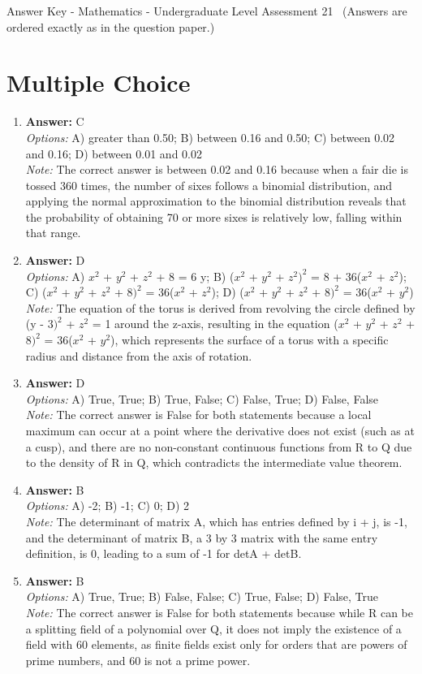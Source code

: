 \documentclass[12pt]{article}
\begin{document}
\begin{center}
Answer Key - Mathematics - Undergraduate Level Assessment 21 \
\small (Answers are ordered exactly as in the question paper.)
\end{center}

\section*{Multiple Choice}
\begin{enumerate}[label=\arabic*.]
\item \textbf{Answer:} C
\\ \textit{Options:} A) greater than 0.50; B) between 0.16 and 0.50; C) between 0.02 and 0.16; D) between 0.01 and 0.02
\\ \textit{Note:} The correct answer is between 0.02 and 0.16 because when a fair die is tossed 360 times, the number of sixes follows a binomial distribution, and applying the normal approximation to the binomial distribution reveals that the probability of obtaining 70 or more sixes is relatively low, falling within that range.
\item \textbf{Answer:} D
\\ \textit{Options:} A) $x^2$ + $y^2$ + $z^2$ + 8 = 6 y; B) ($x^2$ + $y^2$ + $z^2$$)^2$ = 8 + 36($x^2$ + $z^2$); C) ($x^2$ + $y^2$ + $z^2$ + $8)^2$ = 36($x^2$ + $z^2$); D) ($x^2$ + $y^2$ + $z^2$ + $8)^2$ = 36($x^2$ + $y^2$)
\\ \textit{Note:} The equation of the torus is derived from revolving the circle defined by (y - $3)^2$ + $z^2$ = 1 around the z-axis, resulting in the equation ($x^2$ + $y^2$ + $z^2$ + $8)^2$ = 36($x^2$ + $y^2$), which represents the surface of a torus with a specific radius and distance from the axis of rotation.
\item \textbf{Answer:} D
\\ \textit{Options:} A) True, True; B) True, False; C) False, True; D) False, False
\\ \textit{Note:} The correct answer is False for both statements because a local maximum can occur at a point where the derivative does not exist (such as at a cusp), and there are no non-constant continuous functions from R to Q due to the density of R in Q, which contradicts the intermediate value theorem.
\item \textbf{Answer:} B
\\ \textit{Options:} A) -2; B) -1; C) 0; D) 2
\\ \textit{Note:} The determinant of matrix A, which has entries defined by i + j, is -1, and the determinant of matrix B, a 3 by 3 matrix with the same entry definition, is 0, leading to a sum of -1 for detA + detB.
\item \textbf{Answer:} B
\\ \textit{Options:} A) True, True; B) False, False; C) True, False; D) False, True
\\ \textit{Note:} The correct answer is False for both statements because while R can be a splitting field of a polynomial over Q, it does not imply the existence of a field with 60 elements, as finite fields exist only for orders that are powers of prime numbers, and 60 is not a prime power.
\end{enumerate}
\end{document}
